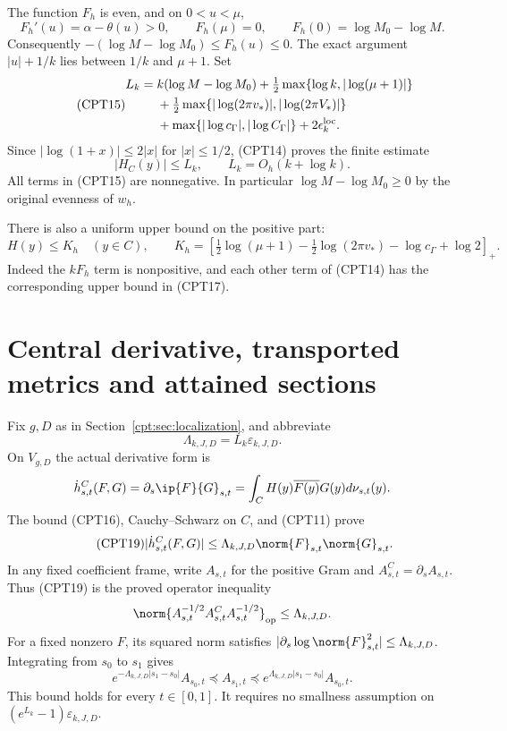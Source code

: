 The function \(F_h\) is even, and on \(0<u<\mu\),
\[
 F_h'(u)=\alpha-\theta(u)>0,\qquad F_h(\mu)=0,\qquad
 F_h(0)=\log M_0-\log M.
\]
Consequently \(-(\log M-\log M_0)\le F_h(u)\le0\).
The exact argument \(|u|+1/k\) lies between \(1/k\) and \(\mu+1\).
Set
\begin{equation}\tag{CPT15}
\begin{split}
 L_k={}&k(\log M-\log M_0)
 +\tfrac12\max\{\log k,|\log(\mu+1)|\}\\
 &+\tfrac12\max\{|\log(2\pi v_*)|,|\log(2\pi V_*)|\}\\
 &+\max\{|\log c_\Gamma|,|\log C_\Gamma|\}
 +2\epsilon_k^{\rm loc}.
\end{split}
\end{equation}
Since \(|\log(1+x)|\le2|x|\) for \(|x|\le1/2\),
(CPT14) proves the finite estimate
\begin{equation}\tag{CPT16}
 |H_C(y)|\le L_k,\qquad L_k=O_h(k+\log k).
\end{equation}
All terms in (CPT15) are nonnegative.  In particular
\(\log M-\log M_0\ge0\) by the original evenness of \(w_h\).

There is also a uniform upper bound on the positive part:
\begin{equation}\tag{CPT17}
 H(y)\le K_h\quad(y\in C),\qquad
 K_h=\left[
 \tfrac12\log(\mu+1)-\tfrac12\log(2\pi v_*)
 -\log c_\Gamma+\log2\right]_+.
\end{equation}
Indeed the \(kF_h\) term is nonpositive, and each other term of
(CPT14) has the corresponding upper bound in (CPT17).

\section{Central derivative, transported metrics and attained sections}
\label{cpt:sec:sections}

Fix \(g,D\) as in Section~\ref{cpt:sec:localization}, and abbreviate
\begin{equation}\tag{CPT18}
 \Lambda_{k,J,D}=L_k\varepsilon_{k,J,D}.
\end{equation}
On \(V_{g,D}\) the actual derivative form is
\[
 \dot h^C_{s,t}(F,G)
 =\partial_s\ip{F}{G}_{s,t}
 =\int_C H(y)\overline{F(y)}G(y)d\nu_{s,t}(y).
\]
The bound (CPT16), Cauchy--Schwarz on \(C\), and (CPT11) prove
\begin{equation}\tag{CPT19}
 |\dot h^C_{s,t}(F,G)|
 \le\Lambda_{k,J,D}\norm{F}_{s,t}\norm{G}_{s,t}.
\end{equation}
In any fixed coefficient frame, write \(A_{s,t}\) for the
positive Gram and \(A^C_{s,t}=\partial_s A_{s,t}\).
Thus (CPT19) is the proved operator inequality
\[
 \norm{A_{s,t}^{-1/2}A^C_{s,t}A_{s,t}^{-1/2}}_{\rm op}
 \le\Lambda_{k,J,D}.
\]
For a fixed nonzero \(F\), its squared norm satisfies
\(|\partial_s\log\norm{F}_{s,t}^2|\le\Lambda_{k,J,D}\).
Integrating from \(s_0\) to \(s_1\) gives
\begin{equation}\tag{CPT20}
 e^{-\Lambda_{k,J,D}|s_1-s_0|}A_{s_0,t}
 \preceq A_{s_1,t}
 \preceq e^{\Lambda_{k,J,D}|s_1-s_0|}A_{s_0,t}.
\end{equation}
This bound holds for every \(t\in[0,1]\).
It requires no smallness assumption on
\((e^{L_k}-1)\varepsilon_{k,J,D}\).

